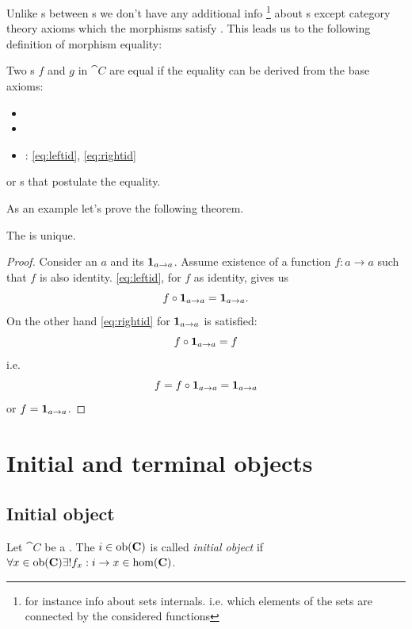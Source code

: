 Unlike s between s we don't
have any additional info 
\footnote{
for instance info about sets internals. i.e. which elements of the sets
are connected by the considered functions
}
about s except
category theory axioms which the morphisms satisfy 
\cite{bib:stackexchange:morphism:equality}. This leads us to the
following definition of morphism equality:
\begin{definition}
\label{def:morphism_equality}
Two s $f$ and $g$ in 
$\cat{C}$ are equal if the equality can be derived from the base axioms: 
\begin{itemize}
\item {}
\item {}
\item {}: \eqref{eq:leftid}, \eqref{eq:rightid}
\end{itemize}
or s that postulate the equality.
\end{definition}
As an example let's prove the following theorem.
\begin{theorem}
\label{thm:identity_unique}
The  is unique.
\begin{proof}
Consider an  $a$ and its 
$\mathbf{1}_{ a \to a }$. Assume existence of a function $f: a \to a$ such that $f$ is also
identity. \eqref{eq:leftid}, for $f$ as identity, gives us
\[
f \circ \mathbf{1}_{ a \to a } = \mathbf{1}_{ a \to a }.
\]
On the other hand \eqref{eq:rightid} for $\mathbf{1}_{ a \to a }$ is satisfied:
\[
f \circ \mathbf{1}_{ a \to a } = f
\]
i.e.
\[
f = f \circ \mathbf{1}_{ a \to a } = \mathbf{1}_{ a \to a }
\] 
or
$f = \mathbf{1}_{ a \to a }$.
\end{proof}
\end{theorem}

\section{Initial and terminal objects}

\subsection{Initial object}

\begin{definition}
\label{def:initial_object}
Let $\cat{C}$ be a . The
 $i \in \mathrm{ob}(\mathbf{C})$ is called
\textit{initial object} if $\forall x \in \mathrm{ob}(\mathbf{C})
\exists! f_x: i \to x \in \mathrm{hom}(\mathbf{C})$.
\end{definition}

